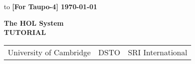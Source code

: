 

\begin{titlepage}
\null\vskip-47pt
\hbox to \textwidth
{\bf [For \holn{} Taupo-4] { \hfil \today}}

\setcounter{page}{1}                      %

\vspace*{60mm}


\begin{center}
 {\Huge\bf The HOL System}\\[0.4cm]
{\LARGE\bf TUTORIAL}\\[2.5cm]
\end{center}


\vspace*{100mm}
\begin{center}
\begin{tabular}{ccc}
University of Cambridge & \hspace*{10ex}DSTO\hspace*{10ex} & SRI International
\end{tabular}

\end{center}

\vfill
\end{titlepage}

\thispagestyle{empty}
\mbox{}
\newpage





